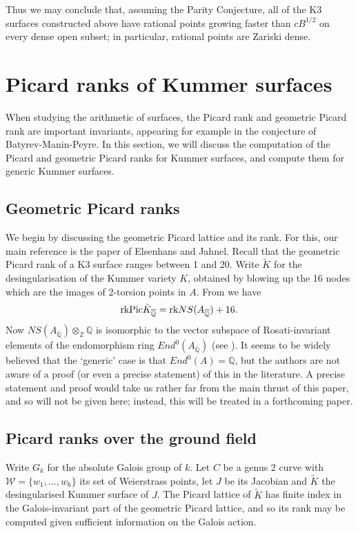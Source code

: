 \documentclass[a4paper,12pt]{amsart}
\begin{document}
Thus we may conclude that, assuming the Parity Conjecture, all of the K3 surfaces constructed above have rational points growing faster than $cB^{1/2}$ on every dense open subset; in particular, rational points are Zariski dense. 

\section{Picard ranks of Kummer surfaces}
When studying the arithmetic of surfaces, the Picard rank and geometric Picard rank are important invariants, appearing for example in the conjecture of Batyrev-Manin-Peyre. In this section, we will discuss the computation of the Picard and geometric Picard ranks for Kummer surfaces, and compute them for generic Kummer surfaces. 

\subsection{Geometric Picard ranks}
We begin by discussing the geometric Picard lattice and its rank. For this, our main reference is the paper \cite{elsenhans2009computation} of Elsenhans and Jahnel. Recall that the geometric Picard rank of a K3 surface ranges between 1 and 20. Write $\tilde{K}$ for the desingularisation of the Kummer variety $K$, obtained by blowing up the 16 nodes which are the images of 2-torsion points in $A$. From \cite[Fact 4.1]{elsenhans2009computation} we have
\begin{equation}
{\operatorname{rk}} {\textnormal{Pic}} \tilde{K}_{\overline{{\mathbb Q}}} = {\operatorname{rk}} NS(A_{\overline{{\mathbb Q}}}) + 16. 
\end{equation}
Now $NS(A_{\overline{{\mathbb Q}}})  \otimes_{{\mathbb Z}} {{\mathbb Q}}$ is isomorphic to the vector subspace of Rosati-invariant elements of the endomorphism ring $End^0(A_{\overline{{\mathbb Q}}})$ (see \cite[Section 20, page 189]{mumford_ab_vars}). It seems to be widely believed that the `generic' case is that $End^0(A) = {{\mathbb Q}}$, but the authors are not aware of a proof (or even a precise statement) of this in the literature. A precise statement and proof would take us rather far from the main thrust of this paper, and so will not be given here; instead, this will be treated in a forthcoming paper. 

\subsection{Picard ranks over the ground field}
Write $G_k$ for the absolute Galois group of $k$. Let $C$ be a genus 2 curve with ${\mathcal{W}} = \{w_1,\ldots,w_6\}$ its set of Weierstrass points, let $J$ be its Jacobian and ${\widetilde{K}}$ the desingularised Kummer surface of $J$. 
The Picard lattice of $\tilde{K}$ has finite index in the Galois-invariant part of the geometric Picard lattice, and so its rank may be computed given sufficient information on the Galois action. 
\end{document}
